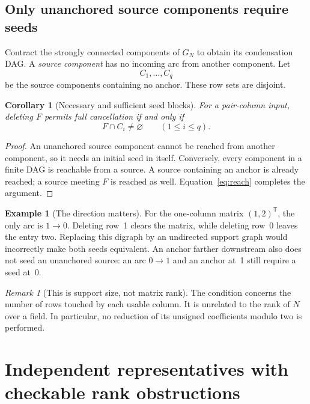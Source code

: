 \documentclass[11pt,letterpaper]{article}
\newtheorem{corollary}[theorem]{Corollary}
\theoremstyle{definition}
\newtheorem{example}[theorem]{Example}
\theoremstyle{remark}
\newtheorem{remark}[theorem]{Remark}
\begin{document}
\subsection{Only unanchored source components require seeds}
Contract the strongly connected components of $G_N$ to obtain its condensation
DAG. A \emph{source component} has no incoming arc from another component. Let
\[
 C_1,\ldots,C_q
\]
be the source components containing no anchor. These row sets are disjoint.

\begin{corollary}[Necessary and sufficient seed blocks]\label{cor:blocks}
For a pair-column input, deleting $F$ permits full cancellation if and only if
\begin{equation}\label{eq:block-hit}
 F\cap C_i\ne\varnothing\qquad(1\le i\le q).
\end{equation}
\end{corollary}
\begin{proof}
An unanchored source component cannot be reached from another component, so it
needs an initial seed in itself. Conversely, every component in a finite DAG is
reachable from a source. A source containing an anchor is already reached; a
source meeting $F$ is reached as well. Equation~\eqref{eq:reach} completes the
argument.
\end{proof}

\begin{example}[The direction matters]
For the one-column matrix $(1,2)^{\mathsf T}$, the only arc is $1\to0$.
Deleting row~1 clears the matrix, while deleting row~0 leaves the entry two.
Replacing this digraph by an undirected support graph would incorrectly make
both seeds equivalent. An anchor farther downstream also does not seed an
unanchored source: an arc $0\to1$ and an anchor at~1 still require a seed at~0.
\end{example}

\begin{remark}[This is support size, not matrix rank]
The condition concerns the number of rows touched by each usable column. It is
unrelated to the rank of $N$ over a field. In particular, no reduction of its
unsigned coefficients modulo two is performed.
\end{remark}

\section{Independent representatives with checkable rank obstructions}\label{sec:intersection}
\end{document}
